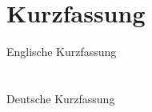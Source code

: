 \let\raggedsection\centering
\section*{Kurzfassung}
Englische Kurzfassung
\section*{\abstractname}
\let\raggedsection\raggedright
Deutsche Kurzfassung
